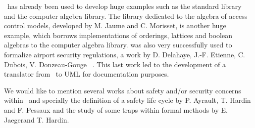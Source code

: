\focal\ has already been used to develop huge examples such as  the
standard library and the computer algebra library. The library
dedicated to the algebra of access control models, developed by
M. Jaume and C. Morisset\cite{jias06,fcsarspa06,MorissetPhd}, 
 is   another huge example, which borrows implementations of orderings,
lattices and boolean algebras to the computer algebra library.   \focal{} was also very
successfully used to formalize airport security regulations, a work by 
D. Delahaye, J.-F. Etienne, C.  Dubois, V. Donzeau-Gouge
~\cite{EDEMOI-All,EDEMOI-Model,EDEMOI-Proof}. This last work led to
the development of a translator\cite{Focal-UML}  from \focal\ to UML
for documentation purposes. 

We would like to mention  several works about safety and/or security
concerns within \focal\  and specially the definition of a safety life
cycle by P. Ayrault, T. Hardin and F. Pessaux \cite{TTSS08} and the study of some traps
within formal methods by E. Jaegerand T. Hardin\cite{traps}. 




